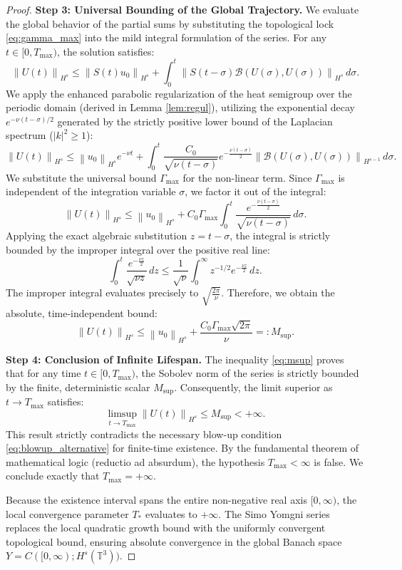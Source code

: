 \documentclass[12pt,a4paper]{article}
\theoremstyle{plain}
\theoremstyle{definition}
\theoremstyle{remark}
\newcommand{\Hs}{H^s}
\newcommand{\T}{\mathbb{T}}
\newcommand{\norm}[1]{\left\|#1\right\|}
\newcommand{\BB}{\mathcal{B}}
\begin{document}
\begin{proof}
\textbf{Step 3: Universal Bounding of the Global Trajectory.}
We evaluate the global behavior of the partial sums by substituting the topological lock \eqref{eq:gamma_max} into the mild integral formulation of the series. For any $t \in [0, T_{\max})$, the solution satisfies:
\[
  \norm{U(t)}_{H^s} \le \norm{S(t)u_0}_{H^s} + \int_0^t \norm{S(t-\sigma)\BB(U(\sigma), U(\sigma))}_{H^s} \,d\sigma.
\]
We apply the enhanced parabolic regularization of the heat semigroup over the periodic domain (derived in Lemma \ref{lem:regul}), utilizing the exponential decay $e^{-\nu(t-\sigma)/2}$ generated by the strictly positive lower bound of the Laplacian spectrum ($|k|^2 \ge 1$):
\[
  \norm{U(t)}_{H^s} \le \norm{u_0}_{H^s} e^{-\nu t} + \int_0^t \frac{C_0}{\sqrt{\nu(t-\sigma)}} e^{-\frac{\nu(t-\sigma)}{2}} \norm{\BB(U(\sigma), U(\sigma))}_{H^{s-1}} \,d\sigma.
\]
We substitute the universal bound $\Gamma_{\max}$ for the non-linear term. Since $\Gamma_{\max}$ is independent of the integration variable $\sigma$, we factor it out of the integral:
\[
  \norm{U(t)}_{H^s} \le \norm{u_0}_{H^s} + C_0 \Gamma_{\max} \int_0^t \frac{e^{-\frac{\nu(t-\sigma)}{2}}}{\sqrt{\nu(t-\sigma)}} \,d\sigma.
\]
Applying the exact algebraic substitution $z = t-\sigma$, the integral is strictly bounded by the improper integral over the positive real line:
\[
  \int_0^t \frac{e^{-\frac{\nu z}{2}}}{\sqrt{\nu z}} \,dz \le \frac{1}{\sqrt{\nu}} \int_0^\infty z^{-1/2} e^{-\frac{\nu z}{2}} \,dz.
\]
The improper integral evaluates precisely to $\sqrt{\frac{2\pi}{\nu}}$. Therefore, we obtain the absolute, time-independent bound:
\begin{equation}
  \norm{U(t)}_{H^s} \le \norm{u_0}_{H^s} + \frac{C_0 \Gamma_{\max} \sqrt{2\pi}}{\nu} =: M_{\sup}. \label{eq:msup}
\end{equation}

\textbf{Step 4: Conclusion of Infinite Lifespan.}
The inequality \eqref{eq:msup} proves that for any time $t \in [0, T_{\max})$, the Sobolev norm of the series is strictly bounded by the finite, deterministic scalar $M_{\sup}$. Consequently, the limit superior as $t \to T_{\max}$ satisfies:
\[
  \limsup_{t \to T_{\max}} \norm{U(t)}_{H^s} \le M_{\sup} < +\infty.
\]
This result strictly contradicts the necessary blow-up condition \eqref{eq:blowup_alternative} for finite-time existence. By the fundamental theorem of mathematical logic (reductio ad absurdum), the hypothesis $T_{\max} < \infty$ is false. We conclude exactly that $T_{\max} = +\infty$.

Because the existence interval spans the entire non-negative real axis $[0, \infty)$, the local convergence parameter $T_*$ evaluates to $+\infty$. The Simo Yomgni series replaces the local quadratic growth bound with the uniformly convergent topological bound, ensuring absolute convergence in the global Banach space $Y = C([0,\infty); \Hs(\T^3))$.
\end{proof}
\end{document}
